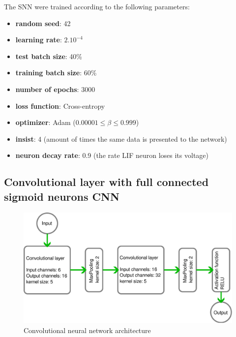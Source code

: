 			\par The SNN were trained according to the following parameters:
			\begin{itemize}
				\item \textbf{random seed}: 42
				\item \textbf{learning rate}: $2.10^{-4}$
				\item \textbf{test batch size}: 40\%
				\item \textbf{training batch size}: 60\%
				\item \textbf{number of epochs}: 3000
				\item \textbf{loss function}: Cross-entropy
				\item \textbf{optimizer}: Adam ($0.00001 \leq \beta \leq 0.999$)
				\item \textbf{insist}: 4 (amount of times the same data is presented to the network)
				\item \textbf{neuron decay rate}: 0.9 (the rate LIF neuron loses its voltage)
			\end{itemize}
	
			
	
	
		\subsection{Convolutional layer with full connected sigmoid neurons CNN}
	
		\begin{figure}[H]
			\centering
			\includegraphics[width=\linewidth]{images/architectureCNN}
			\caption{Convolutional neural network architecture}
			\label{fig:architecturecnn}
		\end{figure}
	
